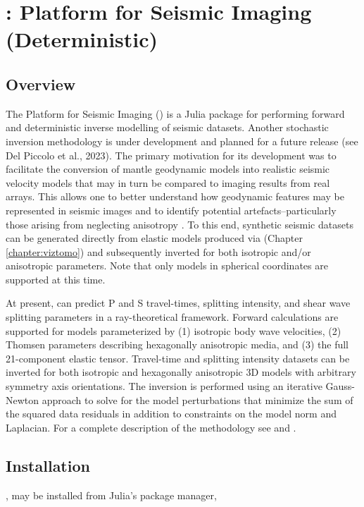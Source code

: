 \chapter{\psitomotitle: Platform for Seismic Imaging (Deterministic)}
\label{chapter:psi_d}

\section{Overview} \label{PSI_D:Overview}
The Platform for Seismic Imaging (\psitomotitle{}) is a Julia package for performing forward and deterministic inverse modelling of seismic datasets. Another stochastic inversion methodology is under development and planned for a future release (see Del Piccolo et al., 2023). The primary motivation for its development was to facilitate the conversion of mantle geodynamic models into realistic seismic velocity models that may in turn be compared to imaging results from real arrays. This allows one to better understand how geodynamic features may be represented in seismic images and to identify potential artefacts--particularly those arising from neglecting anisotropy \citep[e.g.][]{bezada2016g3, vanderbeek2021, vanderbeek2023}. To this end, synthetic seismic datasets can be generated directly from elastic models produced via \viztomotitle{} (Chapter \ref{chapter:viztomo}) and subsequently inverted for both isotropic and/or anisotropic parameters. Note that only \viztomotitle{} models in spherical coordinates are supported at this time.

At present, \psitomotitle{} can predict P and S travel-times, splitting intensity, and shear wave splitting parameters in a ray-theoretical framework. Forward calculations are supported for models parameterized by (1) isotropic body wave velocities, (2) Thomsen parameters describing hexagonally anisotropic media, and (3) the full 21-component elastic tensor. Travel-time and splitting intensity datasets can be inverted for both isotropic and hexagonally anisotropic 3D models with arbitrary symmetry axis orientations. The inversion is performed using an iterative Gauss-Newton approach to solve for the model perturbations that minimize the sum of the squared data residuals in addition to constraints on the model norm and Laplacian. For a complete description of the methodology see \cite{vanderbeek2021} and \cite{vanderbeek2023}.


\section{Installation} \label{PSI_D:Installation}
\psitomotitle{}, may be installed from Julia's package manager,

